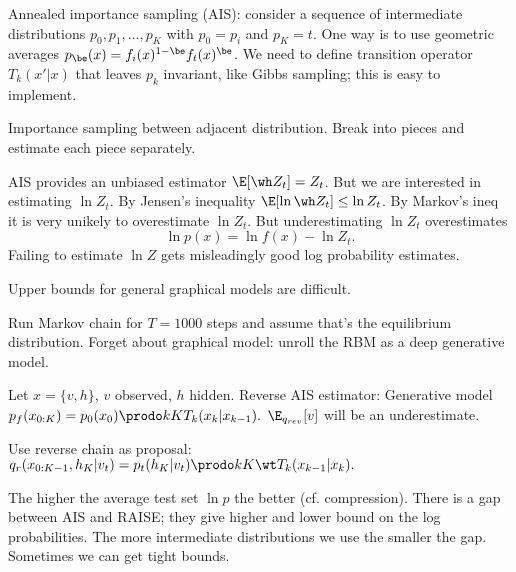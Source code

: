 Annealed importance sampling (AIS): consider a sequence of intermediate distributions $p_0,p_1,\ldots, p_K$ with $p_0=p_i$ and $p_K=t$. One way is to use geometric averages $p_\be(x) = f_i(x)^{1-\be} f_t(x)^\be$. We need to define transition operator $T_k(x'|x)$ that leaves $p_k$ invariant, like Gibbs sampling; this is easy to implement.

Importance sampling between adjacent distribution. Break into pieces and estimate each piece separately.

AIS provides an unbiased estimator $\E[\wh Z_t] = Z_t$. But we are interested in estimating $\ln Z_t$.
By Jensen's inequality $\E[\ln \wh Z_t] \le \ln Z_t$. By Markov's ineq it is very unikely to overestimate $\ln Z_t$. But underestimating $\ln Z_t$ overestimates $$\ln p(x) = \ln f(x) -\ln Z_t.$$ Failing to estimate $\ln Z$ gets misleadingly good log probability estimates.

Upper bounds for general graphical models are difficult. 

Run Markov chain for $T=1000$ steps and assume that's the equilibrium distribution.
Forget about graphical model: unroll the RBM as a deep generative model. %

Let $x=\{v,h\}$, $v$ observed, $h$ hidden. %
Reverse AIS estimator: Generative model $p_f(x_{0:K}) = p_0(x_0)\prodo kK T_k(x_k|x_{k-1}).$
$\E_{q_{rev}}[v]$ will be an underestimate.

 Use reverse chain as proposal: $q_r(x_{0:K-1}, h_K|v_t) = p_t(h_K|v_t)\prodo kK \wt T_k (x_{k-1}|x_k).$
 
The higher the average test set $\ln p$ the better (cf. compression). There is a gap between AIS and RAISE; they give higher and lower bound on the log probabilities. The more intermediate distributions we use the smaller the gap.
Sometimes we can get tight bounds. 




